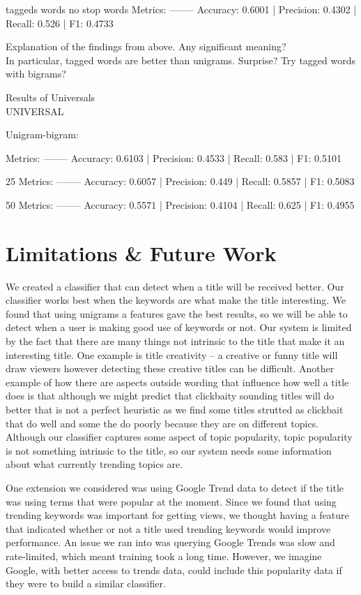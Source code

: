 \documentclass[a4paper,12pt]{article}
\begin{document}
taggeds words no stop words
Metrics:
--------
Accuracy: 0.6001 | Precision: 0.4302 | Recall: 0.526 | F1: 0.4733

Explanation of the findings from above. Any significant meaning? \\ 
In particular, tagged words are better than unigrams. Surprise? Try tagged words with bigrams?

Results of Universals\\

UNIVERSAL

Unigram-bigram:

Metrics:
--------
Accuracy: 0.6103 | Precision: 0.4533 | Recall: 0.583 | F1: 0.5101

25
Metrics:
--------
Accuracy: 0.6057 | Precision: 0.449 | Recall: 0.5857 | F1: 0.5083

50
Metrics:
--------
Accuracy: 0.5571 | Precision: 0.4104 | Recall: 0.625 | F1: 0.4955










\section{Limitations \& Future Work}
We created a classifier that can detect when a title will be received better. Our classifier works best when the keywords are what make the title interesting. We found that using unigrams a features gave the best results, so we will be able to detect when a user is making good use of keywords or not. Our system is limited by the fact that there are many things not intrinsic to the title that make it an interesting title. One example is title creativity -- a creative or funny title will draw viewers however detecting these creative titles can be difficult. Another example of how there are aspects outside wording that influence how well a title does is that although we might predict that clickbaity sounding titles will do better that is not a perfect heuristic as we find some titles strutted as clickbait that do well and some the do poorly because they are on different topics. Although our classifier captures some aspect of topic popularity, topic popularity is not something intrinsic to the title, so our system needs some information about what currently trending topics are.

One extension we considered was using Google Trend data to detect if the title was using terms that were popular at the moment. Since we found that using trending keywords was important for getting views, we thought having a feature that indicated whether or not a title used trending keywords would improve performance. An issue we ran into was querying Google Trends was slow and rate-limited, which meant training took a long time. However, we imagine Google, with better access to trends data, could include this popularity data if they were to build a similar classifier. 
\end{document}
